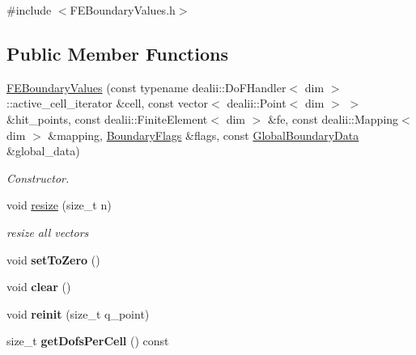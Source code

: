 {\ttfamily \#include $<$FEBoundaryValues.h$>$}\subsection*{Public Member Functions}
\begin{DoxyCompactItemize}
\item 
\hyperlink{classnatrium_1_1FEBoundaryValues_a9122d6b193907bf21c8a091b18c7cad1}{FEBoundaryValues} (const typename dealii::DoFHandler$<$ dim $>$::active\_\-cell\_\-iterator \&cell, const vector$<$ dealii::Point$<$ dim $>$ $>$ \&hit\_\-points, const dealii::FiniteElement$<$ dim $>$ \&fe, const dealii::Mapping$<$ dim $>$ \&mapping, \hyperlink{namespacenatrium_a93b2a3d564675413b9f6cc88c60f46af}{BoundaryFlags} \&flags, const \hyperlink{structnatrium_1_1GlobalBoundaryData}{GlobalBoundaryData} \&global\_\-data)
\begin{DoxyCompactList}\small\item\em Constructor. \item\end{DoxyCompactList}\item 
\hypertarget{classnatrium_1_1FEBoundaryValues_a21eb9c3950af08dcdf61ae680cdf239e}{
void \hyperlink{classnatrium_1_1FEBoundaryValues_a21eb9c3950af08dcdf61ae680cdf239e}{resize} (size\_\-t n)}
\label{classnatrium_1_1FEBoundaryValues_a21eb9c3950af08dcdf61ae680cdf239e}

\begin{DoxyCompactList}\small\item\em resize all vectors \item\end{DoxyCompactList}\item 
\hypertarget{classnatrium_1_1FEBoundaryValues_a0d7d6462f3b4738a89a2cfae56dade81}{
void {\bfseries setToZero} ()}
\label{classnatrium_1_1FEBoundaryValues_a0d7d6462f3b4738a89a2cfae56dade81}

\item 
\hypertarget{classnatrium_1_1FEBoundaryValues_aedd1e1d7f687db75aea18bcafaa58c37}{
void {\bfseries clear} ()}
\label{classnatrium_1_1FEBoundaryValues_aedd1e1d7f687db75aea18bcafaa58c37}

\item 
\hypertarget{classnatrium_1_1FEBoundaryValues_a84fc36ec9a17f3c513cf70785be10aee}{
void {\bfseries reinit} (size\_\-t q\_\-point)}
\label{classnatrium_1_1FEBoundaryValues_a84fc36ec9a17f3c513cf70785be10aee}

\item 
\hypertarget{classnatrium_1_1FEBoundaryValues_aa461bc7861bdd972a1d6c51588c7d1d3}{
size\_\-t {\bfseries getDofsPerCell} () const }
\label{classnatrium_1_1FEBoundaryValues_aa461bc7861bdd972a1d6c51588c7d1d3}


\end{DoxyCompactItemize}
